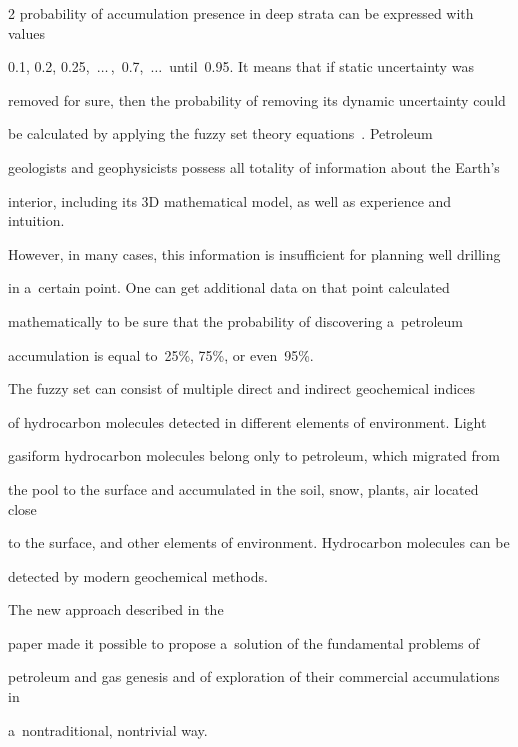 \begin{multicols}{2}
probability of accumulation presence in deep strata can be expressed with values 

0.1, 0.2, 0.25,\ $\ldots$\,,\ 0.7,\ $\ldots$\ until~0.95. It means that if static uncertainty was 

removed for sure, then the probability of removing its dynamic uncertainty could 

be calculated by applying the fuzzy set theory equations~\cite{15-seif}. Petroleum 

geologists and geophysicists possess all totality of information about the Earth's 

interior, including its 3D mathematical model, as well as experience and intuition. 

However, in many cases, this information is insufficient for planning well drilling 

in a~certain point. One can get additional data on that point calculated 

mathematically to be sure that the probability of discovering a~petroleum 

accumulation is equal to~25\%, 75\%, or even~95\%.

     

     The fuzzy set can consist of multiple direct and indirect geochemical indices 

of hydrocarbon molecules detected in different elements of environment. Light 

gasiform hydrocarbon molecules belong only to petroleum, which migrated from 

the pool to the surface and accumulated in the soil, snow, plants, air located close 

to the surface, and other elements of environment. Hydrocarbon molecules can be 

detected by modern geochemical methods.

     

     The new approach described in the 

paper made it possible to propose a~solution of the fundamental problems of 

petroleum and gas genesis and of exploration of their commercial accumulations in 

a~nontraditional, nontrivial way. 

    

\renewcommand{\bibname}{\protect\rmfamily References}






\end{multicols}
